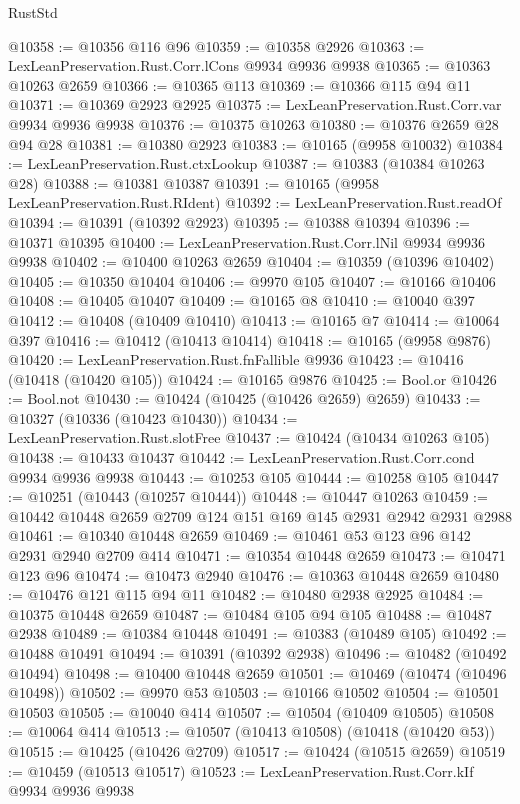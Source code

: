 \begin{lexlean}{RustStd}
\begin{coremodule}
@10358 := @10356 @116 @96
@10359 := @10358 @2926
@10363 := LexLeanPreservation.Rust.Corr.lCons @9934 @9936 @9938
@10365 := @10363 @10263 @2659
@10366 := @10365 @113
@10369 := @10366 @115 @94 @11
@10371 := @10369 @2923 @2925
@10375 := LexLeanPreservation.Rust.Corr.var @9934 @9936 @9938
@10376 := @10375 @10263
@10380 := @10376 @2659 @28 @94 @28
@10381 := @10380 @2923
@10383 := @10165 (@9958 @10032)
@10384 := LexLeanPreservation.Rust.ctxLookup
@10387 := @10383 (@10384 @10263 @28)
@10388 := @10381 @10387
@10391 := @10165 (@9958 LexLeanPreservation.Rust.RIdent)
@10392 := LexLeanPreservation.Rust.readOf
@10394 := @10391 (@10392 @2923)
@10395 := @10388 @10394
@10396 := @10371 @10395
@10400 := LexLeanPreservation.Rust.Corr.lNil @9934 @9936 @9938
@10402 := @10400 @10263 @2659
@10404 := @10359 (@10396 @10402)
@10405 := @10350 @10404
@10406 := @9970 @105
@10407 := @10166 @10406
@10408 := @10405 @10407
@10409 := @10165 @8
@10410 := @10040 @397
@10412 := @10408 (@10409 @10410)
@10413 := @10165 @7
@10414 := @10064 @397
@10416 := @10412 (@10413 @10414)
@10418 := @10165 (@9958 @9876)
@10420 := LexLeanPreservation.Rust.fnFallible @9936
@10423 := @10416 (@10418 (@10420 @105))
@10424 := @10165 @9876
@10425 := Bool.or
@10426 := Bool.not
@10430 := @10424 (@10425 (@10426 @2659) @2659)
@10433 := @10327 (@10336 (@10423 @10430))
@10434 := LexLeanPreservation.Rust.slotFree
@10437 := @10424 (@10434 @10263 @105)
@10438 := @10433 @10437
@10442 := LexLeanPreservation.Rust.Corr.cond @9934 @9936 @9938
@10443 := @10253 @105
@10444 := @10258 @105
@10447 := @10251 (@10443 (@10257 @10444))
@10448 := @10447 @10263
@10459 := @10442 @10448 @2659 @2709 @124 @151 @169 @145 @2931 @2942 @2931 @2988
@10461 := @10340 @10448 @2659
@10469 := @10461 @53 @123 @96 @142 @2931 @2940 @2709 @414
@10471 := @10354 @10448 @2659
@10473 := @10471 @123 @96
@10474 := @10473 @2940
@10476 := @10363 @10448 @2659
@10480 := @10476 @121 @115 @94 @11
@10482 := @10480 @2938 @2925
@10484 := @10375 @10448 @2659
@10487 := @10484 @105 @94 @105
@10488 := @10487 @2938
@10489 := @10384 @10448
@10491 := @10383 (@10489 @105)
@10492 := @10488 @10491
@10494 := @10391 (@10392 @2938)
@10496 := @10482 (@10492 @10494)
@10498 := @10400 @10448 @2659
@10501 := @10469 (@10474 (@10496 @10498))
@10502 := @9970 @53
@10503 := @10166 @10502
@10504 := @10501 @10503
@10505 := @10040 @414
@10507 := @10504 (@10409 @10505)
@10508 := @10064 @414
@10513 := @10507 (@10413 @10508) (@10418 (@10420 @53))
@10515 := @10425 (@10426 @2709)
@10517 := @10424 (@10515 @2659)
@10519 := @10459 (@10513 @10517)
@10523 := LexLeanPreservation.Rust.Corr.kIf @9934 @9936 @9938

\end{coremodule}
\end{lexlean}
